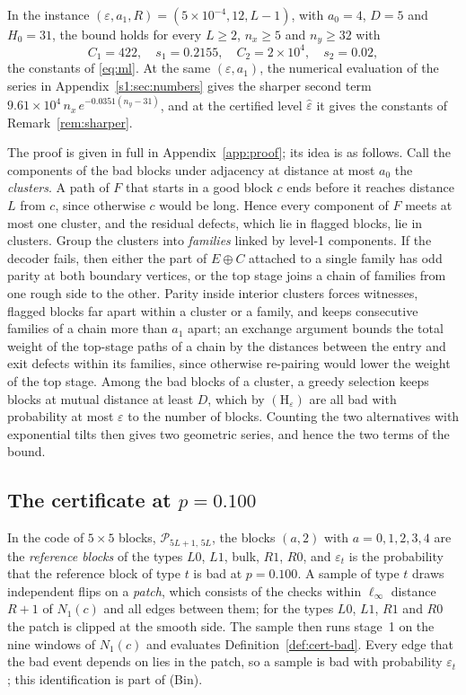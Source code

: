 \documentclass[11pt]{amsart}
\theoremstyle{definition}
\theoremstyle{remark}
\numberwithin{equation}{section}
\begin{document}
In the instance $(\varepsilon,a_1,R)=(5\times10^{-4},12,L-1)$, with $a_0=4$, $D=5$ and $H_0=31$, the bound holds for every $L\ge2$, $n_x\ge5$ and $n_y\ge32$ with
\[
C_1=422,\quad s_1=0.2155,\quad C_2=2\times10^{4},\quad s_2=0.02,
\]
the constants of \eqref{eq:ml}. At the same $(\varepsilon,a_1)$, the numerical evaluation of the series in Appendix~\ref{s1:sec:numbers} gives the sharper second term $9.61\times10^{4}\,n_x\,e^{-0.0351(n_y-31)}$, and at the certified level $\hat\varepsilon$ it gives the constants of Remark~\ref{rem:sharper}.

The proof is given in full in Appendix~\ref{app:proof}; its idea is as follows. Call the components of the bad blocks under adjacency at distance at most $a_0$ the \emph{clusters}. A path of $F$ that starts in a good block $c$ ends before it reaches distance $L$ from $c$, since otherwise $c$ would be long. Hence every component of $F$ meets at most one cluster, and the residual defects, which lie in flagged blocks, lie in clusters. Group the clusters into \emph{families} linked by level-1 components. If the decoder fails, then either the part of $E\oplus C$ attached to a single family has odd parity at both boundary vertices, or the top stage joins a chain of families from one rough side to the other. Parity inside interior clusters forces witnesses, flagged blocks far apart within a cluster or a family, and keeps consecutive families of a chain more than $a_1$ apart; an exchange argument bounds the total weight of the top-stage paths of a chain by the distances between the entry and exit defects within its families, since otherwise re-pairing would lower the weight of the top stage. Among the bad blocks of a cluster, a greedy selection keeps blocks at mutual distance at least $D$, which by $(\mathrm H_\varepsilon)$ are all bad with probability at most $\varepsilon$ to the number of blocks. Counting the two alternatives with exponential tilts then gives two geometric series, and hence the two terms of the bound.

\subsection{The certificate at \texorpdfstring{$p=0.100$}{p = 0.100}}\label{sec:cert-exp}
In the code of $5\times5$ blocks, $\mathcal P_{5L+1,\,5L}$, the blocks $(a,2)$ with $a=0,1,2,3,4$ are the \emph{reference blocks} of the types $L0$, $L1$, bulk, $R1$, $R0$, and $\varepsilon_t$ is the probability that the reference block of type $t$ is bad at $p=0.100$. A sample of type $t$ draws independent flips on a \emph{patch}, which consists of the checks within $\ell_\infty$ distance $R+1$ of $N_1(c)$ and all edges between them; for the types $L0$, $L1$, $R1$ and $R0$ the patch is clipped at the smooth side. The sample then runs stage~1 on the nine windows of $N_1(c)$ and evaluates Definition~\ref{def:cert-bad}. Every edge that the bad event depends on lies in the patch, so a sample is bad with probability $\varepsilon_t$; this identification is part of (Bin).
\end{document}
